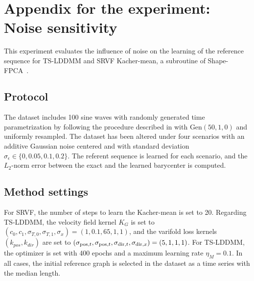 \section{Appendix for the experiment: Noise sensitivity}
\label{appendix: noise sensitivity}
This experiment evaluates the influence of noise on the learning of the reference sequence for TS-LDDMM and SRVF Kacher-mean, a subroutine of Shape-FPCA~\cite{wu2024shape}. 

\subsection{Protocol}
The dataset includes 100 sine waves with randomly generated time parametrization by following the procedure described in  with $\text{Gen}(50,1,0)$ and uniformly resampled. The dataset has been altered under four scenarios with an additive Gaussian noise centered and with standard deviation $\sigma_\epsilon \in \{0,0.05,0.1,0.2\}$. The referent sequence is learned for each scenario, and the $L_2$-norm error between the exact and the learned barycenter is computed. 

\subsection{Method settings}
For SRVF, the number of steps to learn the Kacher-mean is set to 20. Regarding TS-LDDMM, the velocity field kernel $K_G$ is set to $ (c_0,c_1,\sigma_{T,0},\sigma_{T,1},\sigma_x) = (1,0.1,65,1,1)$, and the varifold loss kernels $(k_{pos},k_{dir})$ are set to $(\sigma_{\mathrm{pos},t}, \sigma_{\mathrm{pos},t}, \sigma_{\mathrm{dir},t}, \sigma_{\mathrm{dir},x}) = (5,1,1,1)$. For TS-LDDMM, the optimizer is set with 400 epochs and a maximum learning rate $\eta_M = 0.1$. In all cases, the initial reference graph is selected in the dataset as a time series with the median length.

